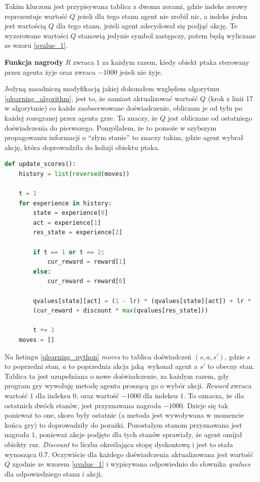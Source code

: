 \documentclass[a4paper, 12pt,oneside]{book}
\begin{document}
Takim kluczom jest przypisywana tablica z dwoma zerami, gdzie
indeks zerowy reprezentuje wartość $Q$ jeżeli dla tego stanu agent nie zrobił
nic, a indeks jeden jest wartością $Q$ dla tego stanu, jeżeli agent zdecydował
się podjąć akcję. Te wyzerowane wartości $Q$ stanowią jedynie symbol zastępczy,
potem będą wyliczane ze wzoru \ref{qvalue_1}.

\textbf{Funkcja nagrody} $R$ zwraca $1$ za każdym razem, kiedy obiekt
ptaka sterowany przez agenta żyje oraz zwraca $-1000$ jeżeli nie żyje.

Jedyną zasadniczą modyfikacją jakiej dokonałem względem algorytmu
\ref{qlearning_algorithm}, jest to, że zamiast aktualizować wartość $Q$ (krok z
linii 17 w algorytmie) co każde zaobserwowane doświadczenie, obliczam je od
tyłu po każdej rozegranej przez agenta grze. To znaczy, że $Q$ jest obliczane
od ostatniego doświadczenia do pierwszego. Pomyślałem, że to pomoże w szybszym
propagowaniu informacji o ``złym stanie'' to znaczy takim, gdzie agent wybrał
akcję, która doprowadziła do kolizji obiektu ptaka. 
\begin{lstlisting}[language=Python, label={qlearning_python},
caption={Zaimplementowany algorytm Q-Learning.}, captionpos=t]
def update_scores():
    history = list(reversed(moves))

    t = 1
    for experience in history:
        state = experience[0]
        act = experience[1]
        res_state = experience[2]

        if t == 1 or t == 2:
            cur_reward = reward[1]
        else:
            cur_reward = reward[0]

        qvalues[state][act] = (1 - lr) * (qvalues[state][act]) + lr *
	    (cur_reward + discount * max(qvalues[res_state]))

        t += 1
    moves = []
\end{lstlisting}
Na listingu \ref{qlearning_python} \textit{moves} to tablica doświadczeń
$(s, a, s')$, gdzie $s$ to poprzedni
stan, $a$ to poprzednia akcja jaką wykonał agent a $s'$ to obecny stan. Tablica
ta jest uzupełniana o nowe doświadczenie, za każdym razem, gdy program gry 
wywołuję metodę agenta proszącą go o wybór akcji. \textit{Reward} zwraca
wartość $1$ dla indeksu $0$, oraz wartość $-1000$ dla indeksu $1$. To oznacza,
że dla ostatnich dwóch stanów, jest przyznawana nagroda $-1000$. Dzieje się tak
ponieważ to one, skoro były ostatnie (a metoda jest wywoływana w momencie końca
gry) to doprowadziły do porażki. Pozostałym stanom przyznawana jest nagroda
$1$, ponieważ akcje podjęte dla tych stanów sprawiały, że agent omijał obiekty
rur. \textit{Discount} to liczba określająca stopę dyskontową i jest to
stała wynosząca $0.7$. Oczywiście dla każdego doświadczenia aktualizowana jest
wartość $Q$ zgodnie ze wzorem \ref{qvalue_1} i wypisywana odpowiednio do
słownika \textit{qvalues} dla odpowiedniego stanu i akcji. 
\end{document}
